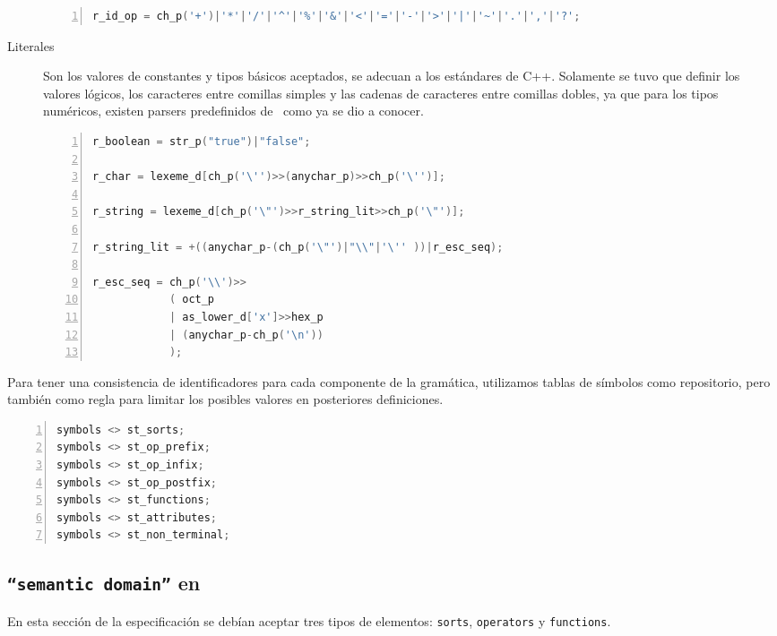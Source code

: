 \begin{description}
\begin{lstlisting}[language=C++, basicstyle=\scriptsize, numbers=left, numbersep=5pt, numberstyle=\tiny]
r_id_op = ch_p('+')|'*'|'/'|'^'|'%'|'&'|'<'|'='|'-'|'>'|'|'|'~'|'.'|','|'?';
\end{lstlisting}

\item [Literales] Son los valores de constantes y tipos básicos aceptados, se adecuan a los estándares de C++. Solamente se tuvo que definir los valores lógicos, los caracteres entre comillas simples y las cadenas de caracteres entre comillas dobles, ya que para los tipos numéricos, existen parsers predefinidos de \spirit\ como ya se dio a conocer.

\begin{lstlisting}[language=C++, basicstyle=\scriptsize, numbers=left, numbersep=5pt, numberstyle=\tiny]
r_boolean = str_p("true")|"false";

r_char = lexeme_d[ch_p('\'')>>(anychar_p)>>ch_p('\'')];

r_string = lexeme_d[ch_p('\"')>>r_string_lit>>ch_p('\"')];

r_string_lit = +((anychar_p-(ch_p('\"')|"\\"|'\'' ))|r_esc_seq);

r_esc_seq = ch_p('\\')>>
            ( oct_p
            | as_lower_d['x']>>hex_p
            | (anychar_p-ch_p('\n'))
            );               
\end{lstlisting}
\end{description}

Para tener una consistencia de identificadores para cada componente de la gramática, utilizamos tablas de símbolos como repositorio, pero también como regla para limitar los posibles valores en posteriores definiciones.

\begin{lstlisting}[language=C++, basicstyle=\scriptsize,numbers=left, numbersep=5pt, numberstyle=\tiny]
symbols <> st_sorts;
symbols <> st_op_prefix;
symbols <> st_op_infix;
symbols <> st_op_postfix;
symbols <> st_functions;
symbols <> st_attributes;
symbols <> st_non_terminal;
\end{lstlisting}

\subsection{\texttt{``semantic domain''} en \spirit}

En esta sección de la especificación se debían aceptar tres tipos de elementos: \texttt{sorts}, \texttt{operators} y \texttt{functions}.

